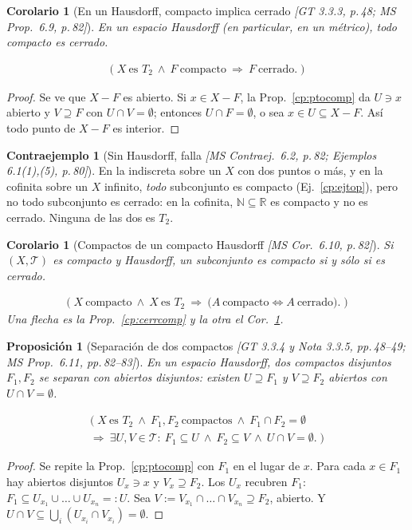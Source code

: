 \documentclass[11pt,a4paper]{article}
\newcommand{\lgc}[1]{\par\vspace{-3pt}\begin{gather*}\big(\;#1\;\big)\end{gather*}\vspace{-6pt}}
\theoremstyle{definition}
\newtheorem{contraejemplo}[definicion]{Contraejemplo}
\theoremstyle{plain}
\newtheorem{proposicion}[definicion]{Proposición}
\newtheorem{corolario}[definicion]{Corolario}
\newcommand{\fnt}[1]{{\normalfont\small\itshape\color{gray!150!black}[#1]}}
\newcommand{\R}{\mathbb{R}}
\newcommand{\N}{\mathbb{N}}
\newcommand{\tp}{\mathcal{T}}
\begin{document}
\begin{corolario}[En un Hausdorff, compacto implica cerrado \fnt{GT 3.3.3, p.\,48; MS Prop.\ 6.9, p.\,82}]\label{cp:compcerr}
En un espacio Hausdorff (en particular, en un métrico), todo compacto es cerrado.
\lgc{X\ \text{es } T_2\ \wedge\ F\ \text{compacto}\ \Rightarrow\ F\ \text{cerrado}.}
\end{corolario}

\begin{proof}
Se ve que $X-F$ es abierto. Si $x\in X-F$, la Prop.~\ref{cp:ptocomp} da $U\ni x$ abierto y $V\supseteq F$ con $U\cap V=\emptyset$; entonces $U\cap F=\emptyset$, o sea $x\in U\subseteq X-F$. Así todo punto de $X-F$ es interior.
\end{proof}

\begin{contraejemplo}[Sin Hausdorff, falla \fnt{MS Contraej.\ 6.2, p.\,82; Ejemplos 6.1(1),(5), p.\,80}]\label{cp:not2}
En la indiscreta sobre un $X$ con dos puntos o más, y en la cofinita sobre un $X$ infinito, \emph{todo} subconjunto es compacto (Ej.~\ref{cp:ejtop}), pero no todo subconjunto es cerrado: en la cofinita, $\N\subseteq\R$ es compacto y no es cerrado. Ninguna de las dos es $T_2$.
\end{contraejemplo}

\begin{corolario}[Compactos de un compacto Hausdorff \fnt{MS Cor.\ 6.10, p.\,82}]\label{cp:compT2}
Si $(X,\tp)$ es compacto y Hausdorff, un subconjunto es compacto si y sólo si es cerrado.
\lgc{X\ \text{compacto}\ \wedge\ X\ \text{es }T_2\ \Rightarrow\ \big(A\ \text{compacto}\iff A\ \text{cerrado}\big).}
Una flecha es la Prop.~\ref{cp:cerrcomp} y la otra el Cor.~\ref{cp:compcerr}.
\end{corolario}

\begin{proposicion}[Separación de dos compactos \fnt{GT 3.3.4 y Nota 3.3.5, pp.\,48--49; MS Prop.\ 6.11, pp.\,82--83}]\label{cp:doscomp}
En un espacio Hausdorff, dos compactos disjuntos $F_1,F_2$ se separan con abiertos disjuntos: existen $U\supseteq F_1$ y $V\supseteq F_2$ abiertos con $U\cap V=\emptyset$.
\lgc{X\ \text{es } T_2\ \wedge\ F_1,F_2\ \text{compactos}\ \wedge\ F_1\cap F_2=\emptyset\\ \Rightarrow\ \exists U,V\in\tp:\ F_1\subseteq U\ \wedge\ F_2\subseteq V\ \wedge\ U\cap V=\emptyset.}
\end{proposicion}

\begin{proof}
Se repite la Prop.~\ref{cp:ptocomp} con $F_1$ en el lugar de $x$. Para cada $x\in F_1$ hay abiertos disjuntos $U_x\ni x$ y $V_x\supseteq F_2$. Los $U_x$ recubren $F_1$: $F_1\subseteq U_{x_1}\cup\dots\cup U_{x_n}=:U$. Sea $V:=V_{x_1}\cap\dots\cap V_{x_n}\supseteq F_2$, abierto. Y $U\cap V\subseteq\bigcup_i(U_{x_i}\cap V_{x_i})=\emptyset$.
\end{proof}
\end{document}
